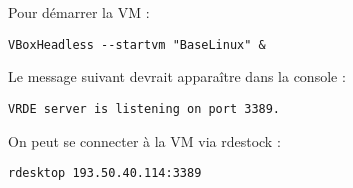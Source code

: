 Pour démarrer la VM :

\begin{verbatim}
VBoxHeadless --startvm "BaseLinux" &
\end{verbatim}

Le message suivant devrait apparaître dans la console :

\begin{verbatim}
VRDE server is listening on port 3389.
\end{verbatim}

On peut se connecter à la VM via rdestock :

\begin{verbatim}
rdesktop 193.50.40.114:3389
\end{verbatim}
